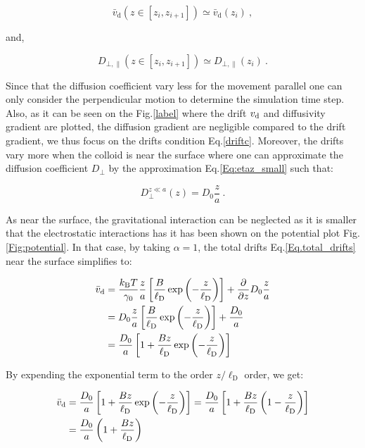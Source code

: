 \begin{equation}
	\bar{v}_\mathrm{d} (z \in [z_i, z_{i+1}]) \simeq \bar{v}_\mathrm{d} (z_i) ~,
	\label{driftc}
\end{equation}

and,

\begin{equation}
	D_{\bot, \parallel}(z \in [z_i, z_{i+1}]) \simeq D_{\bot, \parallel}(z_i) ~.
\end{equation}

Since that the diffusion coefficient vary less for the movement parallel one can only consider the perpendicular motion to determine the simulation time step. Also, as it can be seen on the Fig.\ref{label} where the drift $v_\textnormal{d}$ and diffusivity gradient are plotted, the diffusion gradient are negligible compared to the drift gradient, we thus focus on the drifts condition Eq.\ref{driftc}. Moreover, the drifts vary more when the colloid is near the surface where one can approximate the diffusion coefficient $D_\bot$ by the approximation Eq.\ref{Eq:etaz_small} such that:

\begin{equation}
	D_\bot ^{z\ll a} (z) = D_ 0 \frac{z}{a} ~.
\end{equation}

As near the surface, the gravitational interaction can be neglected as it is smaller that the electrostatic interactions has it has been shown on the potential plot Fig.\ref{Fig:potential}. In that case, by taking $\alpha = 1$, the total drifts Eq.\ref{Eq.total_drifts} near the surface simplifies to:

\begin{equation}
	\begin{aligned}
		\bar{v}_\textnormal{d} &=  \frac{k_\mathrm{B}T}{\gamma_0} \frac{z}{a} \left[\frac{B}{\ell_\mathrm{D}} \exp \left(-\frac{z}{\ell_\mathrm{D}}\right)\right] + \frac{\partial}{\partial z} D_0 \frac{z}{a} \\
		&= D_0 \frac{z}{a} \left[\frac{B}{\ell_\mathrm{D}} \exp \left(-\frac{z}{\ell_\mathrm{D}}\right)\right] + \frac{D_0}{a} \\
		&= \frac{D_0}{a} \left[ 1 + \frac{Bz}{\ell_\mathrm{D}} \exp \left(-\frac{z}{\ell_\mathrm{D}}\right)\right]
	\end{aligned}
\end{equation}

By expending the exponential term to the order $z/\ell_\mathrm{D}$ order, we get:

\begin{equation}
	\begin{aligned}
		\bar{v}_\textnormal{d} &= \frac{D_0}{a} \left[ 1 + \frac{Bz}{\ell_\mathrm{D}} \exp \left(-\frac{z}{\ell_\mathrm{D}}\right)\right]
		 =  \frac{D_0}{a} \left[ 1 + \frac{Bz}{\ell_\mathrm{D}}  \left(1 -\frac{z}{\ell_\mathrm{D}}\right)\right] \\
		& = \frac{D_0}{a} \left( 1 + \frac{B z}{\ell_\mathrm{D}}\right)
	\end{aligned}
	\label{drifts_short}
\end{equation}

